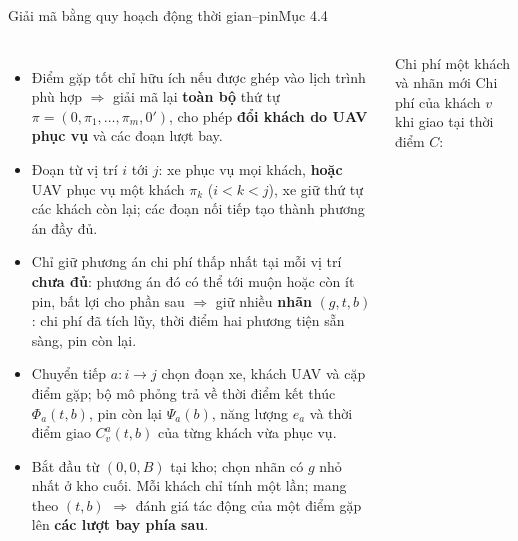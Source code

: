 \documentclass[aspectratio=169,10pt,t,xcolor={table}]{beamer}
\newcommand{\src}[1]{\hfill{\normalfont\footnotesize\color{white!62!navy}#1}}  %
\begin{document}
\begin{frame}{Giải mã bằng quy hoạch động thời gian--pin\src{Mục 4.4}}
\begin{columns}[T,onlytextwidth]
\begin{itemize}\scriptsize
\item Điểm gặp tốt chỉ hữu ích nếu được ghép vào lịch trình phù hợp $\Rightarrow$ giải mã lại \textbf{toàn bộ} thứ tự $\pi=(0,\pi_1,\ldots,\pi_m,0')$, cho phép \textbf{đổi khách do UAV phục vụ} và các đoạn lượt bay.
\item Đoạn từ vị trí $i$ tới $j$: xe phục vụ mọi khách, \textbf{hoặc} UAV phục vụ một khách $\pi_k$ ($i<k<j$), xe giữ thứ tự các khách còn lại; các đoạn nối tiếp tạo thành phương án đầy đủ.
\item Chỉ giữ phương án chi phí thấp nhất tại mỗi vị trí \textbf{chưa đủ}: phương án đó có thể tới muộn hoặc còn ít pin, bất lợi cho phần sau $\Rightarrow$ giữ nhiều \textbf{nhãn} $(g,t,b)$: chi phí đã tích lũy, thời điểm hai phương tiện sẵn sàng, pin còn lại.
\item Chuyển tiếp $a:i\to j$ chọn đoạn xe, khách UAV và cặp điểm gặp; bộ mô phỏng trả về thời điểm kết thúc $\Phi_a(t,b)$, pin còn lại $\Psi_a(b)$, năng lượng $e_a$ và thời điểm giao $C_v^a(t,b)$ của từng khách vừa phục vụ.
\item Bắt đầu từ $(0,0,B)$ tại kho; chọn nhãn có $g$ nhỏ nhất ở kho cuối. Mỗi khách chỉ tính một lần; mang theo $(t,b)$ $\Rightarrow$ đánh giá tác động của một điểm gặp lên \textbf{các lượt bay phía sau}.
\end{itemize}
\centering
{}
\vspace{2pt}
\begin{block}{Chi phí một khách và nhãn mới}
\scriptsize
Chi phí của khách $v$ khi giao tại thời điểm $C$:

\end{block}
\end{columns}
\end{frame}
\end{document}
